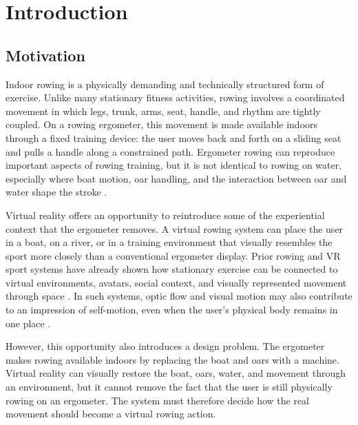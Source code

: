 \chapter{Introduction}
\label{chap:introduction}

\section{Motivation}
\label{sec:introduction_motivation}

Indoor rowing is a physically demanding and technically structured form of exercise. Unlike many stationary fitness activities, rowing involves a coordinated movement in which legs, trunk, arms, seat, handle, and rhythm are tightly coupled. On a rowing ergometer, this movement is made available indoors through a fixed training device: the user moves back and forth on a sliding seat and pulls a handle along a constrained path. Ergometer rowing can reproduce important aspects of rowing training, but it is not identical to rowing on water, especially where boat motion, oar handling, and the interaction between oar and water shape the stroke \parencite{soperHume2004rowingTechnique,lamb1989kinematicComparison,rauterEtAl2013rowingTransfer}.

Virtual reality offers an opportunity to reintroduce some of the experiential context that the ergometer removes. A virtual rowing system can place the user in a boat, on a river, or in a training environment that visually resembles the sport more closely than a conventional ergometer display. Prior rowing and VR sport systems have already shown how stationary exercise can be connected to virtual environments, avatars, social context, and visually represented movement through space \parencite{murrayEtAl2016vrRowingPresence,arndtEtAl2018vrRowingWorkouts,neumannEtAl2018interactiveVrSport}. In such systems, optic flow and visual motion may also contribute to an impression of self-motion, even when the user's physical body remains in one place \parencite{niehorster2021opticFlowHistory,palmisanoEtAl2015vectionChallenges}.

However, this opportunity also introduces a design problem. The ergometer makes rowing available indoors by replacing the boat and oars with a machine. Virtual reality can visually restore the boat, oars, water, and movement through an environment, but it cannot remove the fact that the user is still physically rowing on an ergometer. The system must therefore decide how the real movement should become a virtual rowing action.

